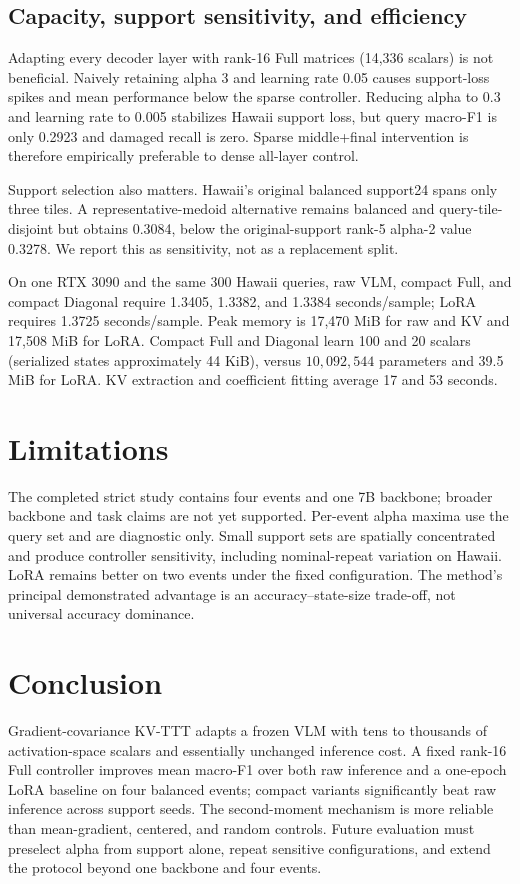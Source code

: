 \documentclass[conference]{IEEEtran}
\newcommand{\KVTTT}{\textsc{KV-TTT}}
\begin{document}
\subsection{Capacity, support sensitivity, and efficiency}
Adapting every decoder layer with rank-16 Full matrices (14,336 scalars) is not
beneficial. Naively retaining alpha 3 and learning rate 0.05 causes support-loss
spikes and mean performance below the sparse controller. Reducing alpha to 0.3
and learning rate to 0.005 stabilizes Hawaii support loss, but query macro-F1
is only 0.2923 and damaged recall is zero. Sparse middle+final intervention is
therefore empirically preferable to dense all-layer control.

Support selection also matters. Hawaii's original balanced support24 spans
only three tiles. A representative-medoid alternative remains balanced and
query-tile-disjoint but obtains 0.3084, below the original-support rank-5
alpha-2 value 0.3278. We report this as sensitivity, not as a replacement split.

On one RTX 3090 and the same 300 Hawaii queries, raw VLM, compact Full, and
compact Diagonal require 1.3405, 1.3382, and 1.3384 seconds/sample; LoRA requires
1.3725 seconds/sample. Peak memory is 17,470 MiB for raw and KV and 17,508 MiB
for LoRA. Compact Full and Diagonal learn 100 and 20 scalars (serialized states
approximately 44 KiB), versus $10{,}092{,}544$ parameters and 39.5 MiB for
LoRA. KV extraction and coefficient fitting average 17 and 53 seconds.

\section{Limitations}
The completed strict study contains four events and one 7B backbone; broader
backbone and task claims are not yet supported. Per-event alpha maxima use the
query set and are diagnostic only. Small support sets are spatially concentrated
and produce controller sensitivity, including nominal-repeat variation on
Hawaii. LoRA remains better on two events under the fixed configuration. The
method's principal demonstrated advantage is an accuracy--state-size trade-off,
not universal accuracy dominance.

\section{Conclusion}
Gradient-covariance \KVTTT{} adapts a frozen VLM with tens to thousands of
activation-space scalars and essentially unchanged inference cost. A fixed
rank-16 Full controller improves mean macro-F1 over both raw inference and a
one-epoch LoRA baseline on four balanced events; compact variants significantly
beat raw inference across support seeds. The second-moment mechanism is more
reliable than mean-gradient, centered, and random controls. Future evaluation
must preselect alpha from support alone, repeat sensitive configurations, and
extend the protocol beyond one backbone and four events.
\end{document}
